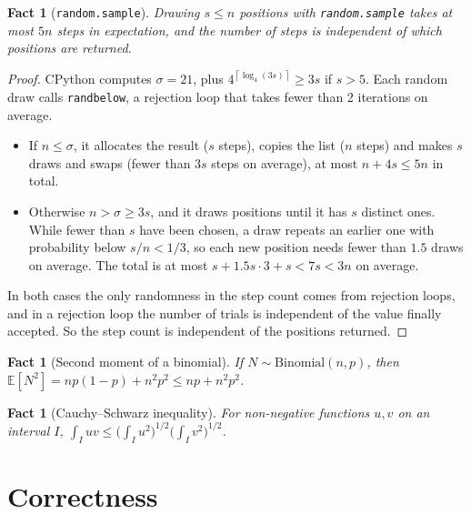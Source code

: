 \documentclass[11pt]{article}
\newtheorem{fact}[theorem]{Fact}
\theoremstyle{definition}
\theoremstyle{remark}
\newcommand{\E}{\mathbb{E}}
\newcommand{\ceil}[1]{\left\lceil #1 \right\rceil}
\newcommand{\code}[1]{\texttt{#1}}
\begin{document}
\begin{fact}[\code{random.sample}]\label{fact:sample}
Drawing $s\le n$ positions with \code{random.sample} takes at most $5n$
steps in expectation, and the number of steps is independent of which
positions are returned.
\end{fact}
\begin{proof}
CPython computes $\sigma=21$, plus $4^{\ceil{\log_4(3s)}}\ge3s$ if $s>5$.
Each random draw calls \code{randbelow}, a rejection loop that takes fewer
than 2 iterations on average.
\begin{itemize}
\item If $n\le\sigma$, it allocates the result ($s$ steps), copies the list
  ($n$ steps) and makes $s$ draws and swaps (fewer than $3s$ steps on
  average), at most $n+4s\le5n$ in total.
\item Otherwise $n>\sigma\ge3s$, and it draws positions until it has $s$
  distinct ones. While fewer than $s$ have been chosen, a draw repeats an
  earlier one with probability below $s/n<1/3$, so each new position needs
  fewer than $1.5$ draws on average. The total is at most
  $s+1.5s\cdot3+s<7s<3n$ on average.
\end{itemize}
In both cases the only randomness in the step count comes from rejection
loops, and in a rejection loop the number of trials is independent of the
value finally accepted. So the step count is independent of the positions
returned.
\end{proof}

\begin{fact}[Second moment of a binomial]\label{fact:binom}
If $N\sim\mathrm{Binomial}(n,p)$, then $\E[N^2]=np(1-p)+n^2p^2\le np+n^2p^2$.
\end{fact}

\begin{fact}[Cauchy--Schwarz inequality]\label{fact:cs}
For non-negative functions $u,v$ on an interval $I$,
$\int_I uv\le\bigl(\int_I u^2\bigr)^{1/2}\bigl(\int_I v^2\bigr)^{1/2}$.
\end{fact}

\section{Correctness}
\end{document}
